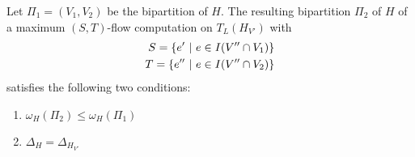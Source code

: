 \begin{theorem}
\label{theorem:ST}
Let $\Pi_1 = (V_1,V_2)$ be the bipartition of $H$. The resulting bipartition $\Pi_2$ 
of $H$ of a maximum $(S,T)$-flow computation on $T_L(H_{V'})$ with
\begin{align*}
S = \{e'\ |\ e \in I(V'' \cap V_1)\} \\
T = \{e''\ |\ e \in I(V'' \cap V_2)\} 
\end{align*}
satisfies the following two conditions:
\begin{enumerate}
\item $\omega_H(\Pi_2) \le \omega_H(\Pi_1)$
\item $\Delta_H = \Delta_{H_{V'}}$
\end{enumerate}
\end{theorem}

